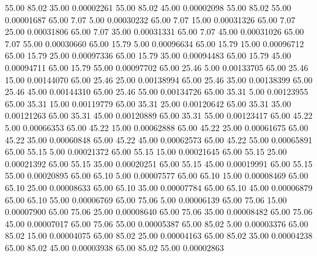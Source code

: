      55.00     85.02     35.00     0.00002261
     55.00     85.02     45.00     0.00002098
     55.00     85.02     55.00     0.00001687
     65.00      7.07      5.00     0.00030232
     65.00      7.07     15.00     0.00031326
     65.00      7.07     25.00     0.00031806
     65.00      7.07     35.00     0.00031331
     65.00      7.07     45.00     0.00031026
     65.00      7.07     55.00     0.00030660
     65.00     15.79      5.00     0.00096634
     65.00     15.79     15.00     0.00096712
     65.00     15.79     25.00     0.00097336
     65.00     15.79     35.00     0.00094483
     65.00     15.79     45.00     0.00094711
     65.00     15.79     55.00     0.00097702
     65.00     25.46      5.00     0.00133705
     65.00     25.46     15.00     0.00144070
     65.00     25.46     25.00     0.00138994
     65.00     25.46     35.00     0.00138399
     65.00     25.46     45.00     0.00144310
     65.00     25.46     55.00     0.00134726
     65.00     35.31      5.00     0.00123955
     65.00     35.31     15.00     0.00119779
     65.00     35.31     25.00     0.00120642
     65.00     35.31     35.00     0.00121263
     65.00     35.31     45.00     0.00120889
     65.00     35.31     55.00     0.00123417
     65.00     45.22      5.00     0.00066353
     65.00     45.22     15.00     0.00062888
     65.00     45.22     25.00     0.00061675
     65.00     45.22     35.00     0.00060848
     65.00     45.22     45.00     0.00062573
     65.00     45.22     55.00     0.00065891
     65.00     55.15      5.00     0.00021372
     65.00     55.15     15.00     0.00021645
     65.00     55.15     25.00     0.00021392
     65.00     55.15     35.00     0.00020251
     65.00     55.15     45.00     0.00019991
     65.00     55.15     55.00     0.00020895
     65.00     65.10      5.00     0.00007577
     65.00     65.10     15.00     0.00008469
     65.00     65.10     25.00     0.00008633
     65.00     65.10     35.00     0.00007784
     65.00     65.10     45.00     0.00006879
     65.00     65.10     55.00     0.00006769
     65.00     75.06      5.00     0.00006139
     65.00     75.06     15.00     0.00007900
     65.00     75.06     25.00     0.00008640
     65.00     75.06     35.00     0.00008482
     65.00     75.06     45.00     0.00007017
     65.00     75.06     55.00     0.00005387
     65.00     85.02      5.00     0.00003376
     65.00     85.02     15.00     0.00004075
     65.00     85.02     25.00     0.00004163
     65.00     85.02     35.00     0.00004238
     65.00     85.02     45.00     0.00003938
     65.00     85.02     55.00     0.00002863
